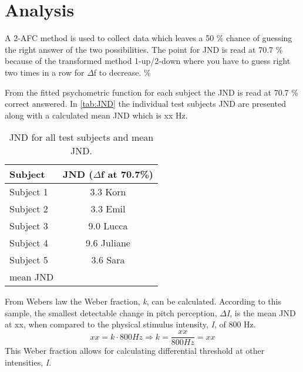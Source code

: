 \section*{Analysis}
A 2-AFC method is used to collect data which leaves a 50 \% chance of guessing the right answer of the two possibilities. The point for JND is read at 70.7 \% because of the transformed method 1-up/2-down where you have to guess right two times in a row for $\Delta$f to decrease.
\%

From the fitted psychometric function for each subject the JND is read at 70.7 \% correct answered. In \autoref{tab:JND} the individual test subjects JND are presented along with a calculated mean JND which is xx Hz. 
%
\begin{table}[H]
	\centering
	\begin{tabular}{l|c}
		Subject     & JND ($\Delta$f at 70.7\%) \\\hline
		Subject 1   & 3.3  Korn            \\\hline
		Subject 2   & 3.3 Emil            \\\hline
		Subject 3   & 9.0 Lucca             \\\hline
		Subject 4   & 9.6 Juliane           \\\hline
		Subject 5   & 3.6 Sara              \\\hline
		mean JND &        
	\end{tabular}
	\caption{JND for all test subjects and mean JND.}
	\label{tab:JND}         
\end{table}
\noindent
%
From Webers law the Weber fraction, \textit{k}, can be calculated. According to this sample, the smallest detectable change in pitch perception, \textit{$\Delta$I}, is the mean JND at xx, when compared to the physical stimulus intensity, \textit{I}, of 800 Hz.
% 
\begin{equation}
xx = k \cdot 800 Hz \Rightarrow k = \frac{xx}{800 Hz} = xx
\end{equation}
%
This Weber fraction allows for calculating differential threshold at other intensities, \textit{I}. 
%
